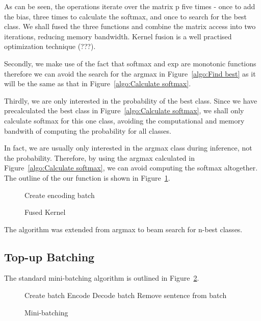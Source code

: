 \documentclass[]{article}
\begin{document}
As can be seen, the operations iterate over the matrix p five times - once to add the bias, three times to calculate the softmax, and once to search for the best class. We shall fused the three functions and combine the matrix access into two iterations, reducing memory bandwidth. Kernel fusion is a well practised optimization technique (???).

Secondly, we make use of the fact that softmax and exp are monotonic functions therefore we can avoid the search for the argmax in Figure~\ref{algo:Find best} as it will be the same as that in Figure~\ref{algo:Calculate softmax}.

Thirdly, we are only interested in the probability of the best class. Since we have precalculated the best class in Figure~\ref{algo:Calculate softmax}, we shall only calculate softmax for this one class, avoiding the computational and memory bandwith of computing the probability for all classes.

In fact, we are usually only interested in the argmax class during inference, not the probability. Therefore, by using the argmax calculated in Figure~\ref{algo:Calculate softmax}, we can avoid computing the softmax altogether. The outline of the our function is shown in Figure~\ref{algo:Fused Kernel}.

\begin{figure} [h]
\begin{algorithmic}
  \STATE Create encoding batch
\ENDWHILE 
\end{algorithmic}
\caption{Fused Kernel}
\label{algo:Fused Kernel}
\end{figure}

The algorithm was extended from argmax to beam search for n-best classes.

\subsection{Top-up Batching}

The standard mini-batching algorithm is outlined in Figure~\ref{algo:Mini-batching}.

\begin{figure} [h]
\begin{algorithmic}
  \STATE Create batch
  \STATE Encode
    \STATE Decode batch
        \STATE Remove sentence from batch
      \ENDIF
    \ENDFOR
  \ENDWHILE
\ENDWHILE 
\end{algorithmic}
\caption{Mini-batching}
\label{algo:Mini-batching}
\end{figure}
\end{document}
